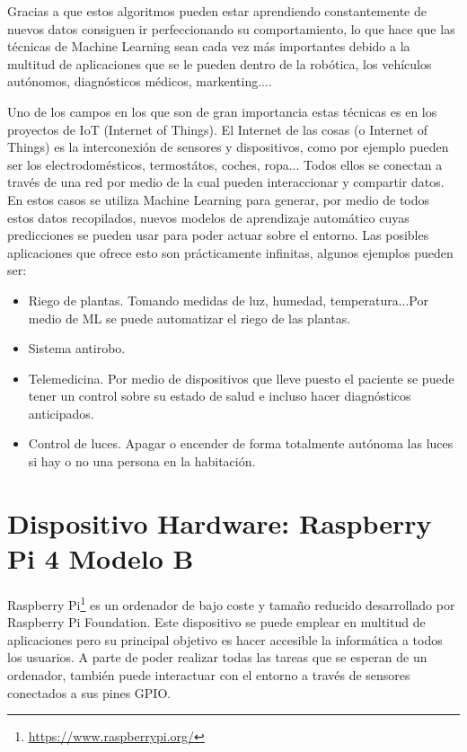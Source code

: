 \documentclass[a4paper, 12pt]{book}
\begin{document}
Gracias a que estos algoritmos pueden estar aprendiendo constantemente de nuevos datos consiguen ir perfeccionando su comportamiento, lo que hace que las técnicas de Machine Learning sean cada vez más importantes debido a la multitud de aplicaciones que se le pueden dentro de la robótica, los vehículos autónomos, diagnósticos médicos, markenting....

Uno de los campos en los que son de gran importancia estas técnicas es en los proyectos de IoT (Internet of Things). El Internet de las cosas (o Internet of Things) es la interconexión de sensores y dispositivos, como por ejemplo pueden ser los electrodomésticos, termostátos, coches, ropa... Todos ellos se conectan a través de una red por medio de la cual pueden interaccionar y compartir datos. En estos casos se utiliza Machine Learning para generar, por medio de todos estos datos recopilados, nuevos modelos de aprendizaje automático cuyas predicciones se pueden usar para poder actuar sobre el entorno. Las posibles aplicaciones que ofrece esto son prácticamente infinitas, algunos ejemplos pueden ser:

\begin{itemize}
    \item Riego de plantas. Tomando medidas de luz, humedad, temperatura...Por medio de ML se puede automatizar el riego de las plantas.
    \item Sistema antirobo. 
    \item Telemedicina. Por medio de dispositivos que lleve puesto el paciente se puede tener un control sobre su estado de salud e incluso hacer diagnósticos anticipados.
    \item Control de luces. Apagar o encender de forma totalmente autónoma las luces si hay o no una persona en la habitación.
\end{itemize}

\section{Dispositivo Hardware: Raspberry Pi 4 Modelo B}
\label{sec:dispositivo_hardware}

Raspberry Pi\footnote{\url{https://www.raspberrypi.org/}} es un ordenador de bajo coste y tamaño reducido desarrollado por Raspberry Pi Foundation. Este dispositivo se puede emplear en  multitud de aplicaciones pero su principal objetivo es hacer accesible la informática a todos los usuarios. A parte de poder realizar todas las tareas que se esperan de un ordenador, también puede interactuar con el entorno a través de sensores conectados a sus pines GPIO.
\end{document}
